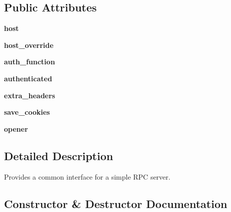 \subsection*{Public Attributes}
\begin{DoxyCompactItemize}
\item 
\mbox{\label{classupload_1_1AbstractRpcServer_ab7188d827e2faddcf970f524f5856192}} 
{\bfseries host}
\item 
\mbox{\label{classupload_1_1AbstractRpcServer_a783a4a7e4ffb776a57a3f267300a213b}} 
{\bfseries host\+\_\+override}
\item 
\mbox{\label{classupload_1_1AbstractRpcServer_aee0090a3bcf07b913a7dd596a5dabb8f}} 
{\bfseries auth\+\_\+function}
\item 
\mbox{\label{classupload_1_1AbstractRpcServer_a692955750c802e461c6336d3000cd365}} 
{\bfseries authenticated}
\item 
\mbox{\label{classupload_1_1AbstractRpcServer_adbbf0109afc13d58d7815fa143cb779f}} 
{\bfseries extra\+\_\+headers}
\item 
\mbox{\label{classupload_1_1AbstractRpcServer_affe342205c4647d41b127f5a5634858b}} 
{\bfseries save\+\_\+cookies}
\item 
\mbox{\label{classupload_1_1AbstractRpcServer_aa931446476e0e86f3ade7fef0a0aea5a}} 
{\bfseries opener}
\end{DoxyCompactItemize}


\subsection{Detailed Description}
\begin{DoxyVerb}Provides a common interface for a simple RPC server.\end{DoxyVerb}
 

\subsection{Constructor \& Destructor Documentation}
\mbox{\label{classupload_1_1AbstractRpcServer_a3f6bc1bd16b52bd5a5c33a1fedeef2d0}} 
